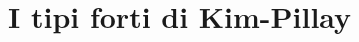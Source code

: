 \begin{comment}
\begin{proof} %

Esiste un tipo $p'(x)\subseteq L(B,b)$ massimale tra i tipi finitamente quasi-soddisfacibili che contengono $p$. Verifichiamo che $p'$ \`e completo. Se per assurdo $p'$ non contiene n\'e $\phi(x,b)$ n\'e $\neg\phi(x,b)$ per una qualche formula $\phi(x,z)\in L(B)$, allora n\'e $p'\cup\big\{\phi(x,b)\big\}$ n\'e $p'\cup\big\{\neg\phi(x,b)\big\}$ sono finitamente quasi-soddisfacibili in $A$. Allora esiste una formula $\psi(x)\in p'$ tale che $\psi(x)\wedge\phi(x,b)$ e $\psi(x)\wedge\neg\phi(x,b)$ vengono omessi da modelli contenenti $A$. Per\`o $[\psi(x)\wedge\phi(x,b)]\vee[\psi(x)\wedge\neg\phi(x,b)]$ Quindi $\psi(x)$ non \`e soddisfatta in $A$, ma questo contraddice la quasi-soddisfacibilit\`a finita di $p'$.
\end{proof}
 
\end{comment}


\section{I tipi forti di Kim-Pillay}
\begin{comment}

Diremo che $\D\subseteq\U^{|z|}$ \`e un \emph{iperimmaginario\/} se \`e invariante e definibile da un tipo. Diremo che ${\mr a},{\mr b}\in\U^{|z|}$ hanno lo stesso \emph{tipo forte di Kim-Pillay\/} se ${\mr a}\in\D\iff{\mr b}\in\D$ per ogni $\D$  iperimmaginario quasi $A\jj$invariante. Scriveremo $\C({\mr a}/A)$ per l'intersezione di tutti gli iperimmaginari quasi $A\jj$invarianti che contengono ${\mr a}$. Questo insieme \`e ovviamente quasi $A\jj$invariante e per la proposizione~\ref{prop_numero_quasi_invarianti} \`e un iperimmaginario (\`e sufficiente fare l'intersezione di $<\kappa$ iperimmaginari quindi il numero di parametri necessari rimane piccolo).
 
\end{comment}



